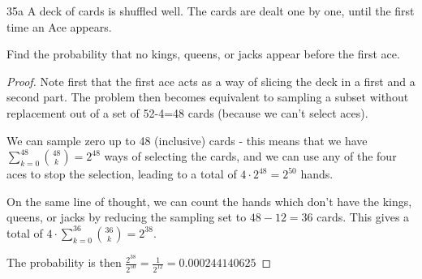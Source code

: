 \begin{exercise}{35a}
A deck of cards is shuffled well. The cards are dealt one by one, until the first time an
Ace appears.

Find the probability that no kings, queens, or jacks appear before the first ace.
\end{exercise}

\begin{proof}
    Note first that the first ace acts as a way of slicing the deck in a first and a second part. The problem then becomes equivalent to sampling a subset without replacement out of a set of 52-4=48 cards (because we can't select aces).

    We can sample zero up to 48 (inclusive) cards - this means that we have $\sum_{k=0}^{48} {48 \choose k} = 2^48$ ways of selecting the cards, and we can use any of the four aces to stop the selection, leading to a total of $4\cdot 2^{48} = 2^{50}$ hands.

    On the same line of thought, we can count the hands which don't have the kings, queens, or jacks by reducing the sampling set to $48-12 = 36$ cards. This gives a total of $4 \cdot \sum_{k=0}^{36} {36 \choose k} = 2^{38}$.

    The probability is then $\frac{2^{38}}{2^{50}} = \frac{1}{2^{12}} = 0.000244140625$
\end{proof}


